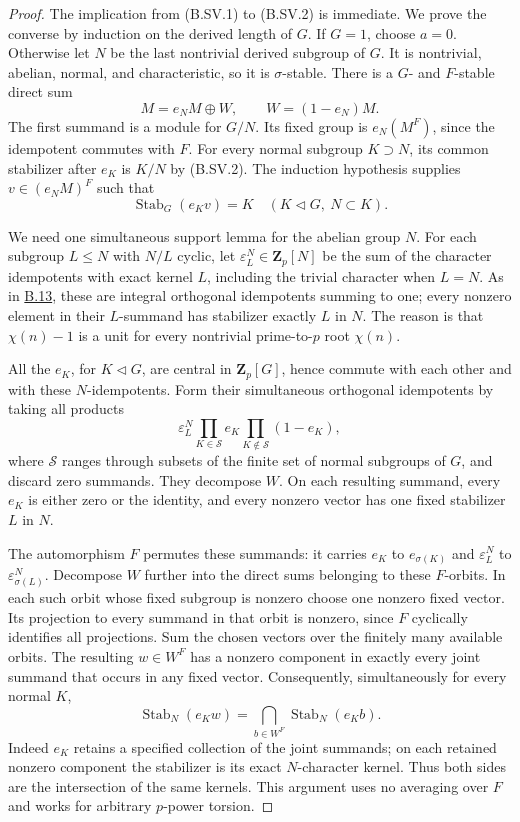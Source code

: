 \documentclass[11pt,a4paper]{article}
\newcommand{\statementref}[1]{\hyperlink{#1}{#1}}
\begin{document}
\begin{proof}
The implication from (B.SV.1) to (B.SV.2) is immediate.
We prove the converse by induction on the derived length
of $G$. If $G=1$, choose $a=0$. Otherwise let $N$ be the
last nontrivial derived subgroup of $G$. It is nontrivial,
abelian, normal, and characteristic, so it is $\sigma$-stable.
There is a $G$- and $F$-stable direct sum
\[
                    M=e_NM\oplus W,\qquad W=(1-e_N)M.          \tag{B.SV.3}
\]
The first summand is a module for $G/N$. Its fixed group is
$e_N(M^F)$, since the idempotent commutes with $F$.
For every normal subgroup $K\supset N$, its common
stabilizer after $e_K$ is $K/N$ by (B.SV.2). The induction
hypothesis supplies $v\in(e_NM)^F$ such that
\[
                \operatorname{Stab}_G(e_Kv)=K
                        \quad(K\triangleleft G,\ N\subset K).
                                                                  \tag{B.SV.4}
\]

We need one simultaneous support lemma for the abelian group
$N$. For each subgroup $L\le N$ with $N/L$ cyclic, let
$\varepsilon_L^N\in\mathbf Z_p[N]$ be the sum of the
character idempotents with exact kernel $L$, including the
trivial character when $L=N$. As in \statementref{B.13},
these are integral orthogonal idempotents summing to one;
every nonzero element in their $L$-summand has stabilizer
exactly $L$ in $N$. The reason is that $\chi(n)-1$ is a
unit for every nontrivial prime-to-$p$ root $\chi(n)$.

All the $e_K$, for $K\triangleleft G$, are central in
$\mathbf Z_p[G]$, hence commute with each other and with
these $N$-idempotents. Form their simultaneous orthogonal
idempotents by taking all products
\[
 \varepsilon_L^N
       \prod_{K\in\mathcal S}e_K
       \prod_{K\notin\mathcal S}(1-e_K),                       \tag{B.SV.5}
\]
where $\mathcal S$ ranges through subsets of the finite set
of normal subgroups of $G$, and discard zero summands.
They decompose $W$. On each resulting summand, every $e_K$
is either zero or the identity, and every nonzero vector has
one fixed stabilizer $L$ in $N$.

The automorphism $F$ permutes these summands: it carries
$e_K$ to $e_{\sigma(K)}$ and $\varepsilon_L^N$ to
$\varepsilon_{\sigma(L)}^N$. Decompose $W$ further into
the direct sums belonging to these $F$-orbits. In each such
orbit whose fixed subgroup is nonzero choose one nonzero
fixed vector. Its projection to every summand in that orbit
is nonzero, since $F$ cyclically identifies all projections.
Sum the chosen vectors over the finitely many available
orbits. The resulting $w\in W^F$ has a nonzero component
in exactly every joint summand that occurs in any fixed
vector. Consequently, simultaneously for every normal $K$,
\[
 \operatorname{Stab}_N(e_Kw)
       =\bigcap_{b\in W^F}\operatorname{Stab}_N(e_Kb).           \tag{B.SV.6}
\]
Indeed $e_K$ retains a specified collection of the joint
summands; on each retained nonzero component the stabilizer
is its exact $N$-character kernel. Thus both sides are the
intersection of the same kernels. This argument uses no
averaging over $F$ and works for arbitrary $p$-power torsion.


\end{proof}
\end{document}
